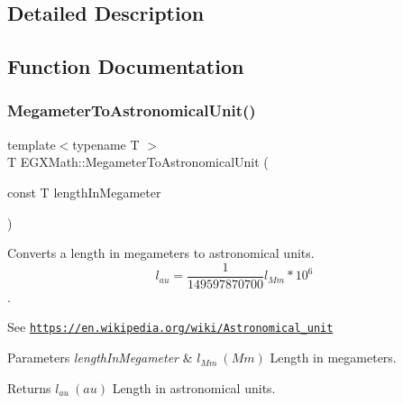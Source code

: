 \subsection{Detailed Description}


\subsection{Function Documentation}
\mbox{\label{group___e_g_x_math-_conversions-_length_conversions-_megameter-_astronomical_gac7cc4e20e973762cb87a8934184cdf6d}} 
\subsubsection{\texorpdfstring{Megameter\+To\+Astronomical\+Unit()}{MegameterToAstronomicalUnit()}}
{\footnotesize\ttfamily template$<$typename T $>$ \\
T E\+G\+X\+Math\+::\+Megameter\+To\+Astronomical\+Unit (\begin{DoxyParamCaption}\item[{const T}]{length\+In\+Megameter }\end{DoxyParamCaption})}



Converts a length in megameters to astronomical units. \[ l_{au}= \frac{1}{149597870700} l_{Mm} * 10^{6} \]. 

See \href{https://en.wikipedia.org/wiki/Astronomical_unit}{\tt https\+://en.\+wikipedia.\+org/wiki/\+Astronomical\+\_\+unit} 
\begin{DoxyParams}{Parameters}
{\em length\+In\+Megameter} & $ l_{Mm}\ (Mm)$ Length in megameters. \\
\hline
\end{DoxyParams}
\begin{DoxyReturn}{Returns}
$ l_{au}\ (au)$ Length in astronomical units. 
\end{DoxyReturn}
\mbox{\label{group___e_g_x_math-_conversions-_length_conversions-_megameter-_astronomical_ga6f5018465cf15f75912695e069b86795}} 

